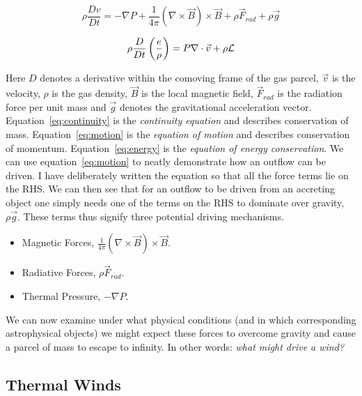 \begin{equation}
\label{eq:motion}
\rho \frac{Dv}{Dt} = -\nabla P + \frac{1}{4 \pi}(\nabla \times \vec{B}) \times \vec{B} + \rho \vec{F}_{rad} + \rho \vec{g}
\end{equation}

\begin{equation}
\label{eq:energy}
\rho \frac{D}{Dt} \left(\frac{e}{\rho}\right) = P \nabla \cdot \vec{v} + \rho \cal{L}
\end{equation}

Here $D$ denotes a derivative within the comoving frame of the gas parcel, $\vec{v}$ is the velocity,
$\rho$ is the gas density, $\vec{B}$ is the local magnetic field, $\vec{F}_{rad}$ is the radiation
force per unit mass and $\vec{g}$ denotes the gravitational acceleration vector.
Equation~\ref{eq:continuity} is the {\em continuity equation} and describes conservation of mass. 
Equation~\ref{eq:motion} is the {\em equation of motion} and describes conservation of momentum.
Equation~\ref{eq:energy} is the {\em equation of energy conservation}. 
We can use equation~\ref{eq:motion} to neatly demonstrate how an outflow can be driven. I have 
deliberately written the equation so that all the force terms lie on the RHS. We can then see that
for an outflow to be driven from an accreting object one simply needs one of the terms on
the RHS to dominate over gravity, $\rho \vec{g}$. These terms thus signify three potential
driving mechanisms.

\begin{itemize}
	\item Magnetic Forces, $\frac{1}{4 \pi}(\nabla \times \vec{B}) \times \vec{B}$.
	\item Radiative Forces, $\rho \vec{F}_{rad}$.
	\item Thermal Pressure, $-\nabla P$.
\end{itemize}

We can now examine under what physical conditions (and in which corresponding astrophysical objects)
we might expect these forces to overcome gravity and cause a parcel of mass to escape to infinity.
In other words: {\em what might drive a wind?}

\subsection{Thermal Winds}

